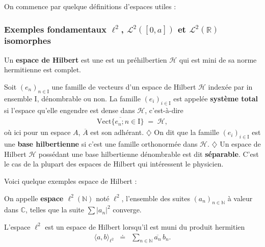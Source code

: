On commence par quelque définitions d'espaces utiles :

\subsubsection{Exemples fondamentaux $\ell^2$, $\mathcal L^2([0,a])$ et $\mathcal L^2(\mathbb R)$ isomorphes}

\begin{Defi} Un {\bf espace de Hilbert} est une est un  préhilbertien ${\mathscr H}$ qui est mini de sa norme hermitienne est complet.\end{Defi}

\begin{Defi}
    Soit $(e_n)_{n \in \mathrm  I}$ une famille de vecteurs d'un espace de Hilbert $\mathscr H$ indexée par in ensemble $\mathrm I$, dénombrable ou non. La famille $(e_i)_{i \in \mathrm  I}$  est appelée {\bf système total}  si l'espace qu'elle engendre est dense dans $\mathscr H$, c'est-à-dire 
    \begin{eqnarray}
        \overline{\mbox{Vect} \{  e_n ; n \in \mathrm I \}}  \; = \; \mathscr H,
    \end{eqnarray}
    où ici pour un espace $A$, $\overline{A}$ est son adhérant.
    \smallskip
    $\diamondsuit$ On dit que la famille $(e_i)_{i \in \mathrm  I}$ est une {\bf base hilbertienne} si c'est une famille orthonormée dans $\mathscr H$. $\diamondsuit$ Un espace de Hilbert $\mathscr H$ possédant une base hilbertienne dénombrable est dit {\bf séparable}. C'est le cas de la plupart des espaces de Hilbert qui intéressent le physicien.

\end{Defi}


\bigskip

Voici quelque exemples espace de Hilbert :
\begin{Defi} 
    On appelle  {\bf espace $\ell^2(\mathbb N)$ } noté $\ell^2$, l'ensemble des suites $(a_n)_{n \in \mathbb N }$ à valeur dans $\mathbb C$, telles que la suite $\sum \vert a_n \vert^2 $ converge.
\end{Defi}

\begin{Theo} 
    L'espace $\ell^2$ est un espace de Hilbert lorsqu'il est muni du produit hermitien 
    \begin{eqnarray}
        \langle a , b \rangle_{\ell^2} & \doteq & \sum_{n \in \mathbb N} \overline{a_n} \,  b_n .
    \end{eqnarray}
\end{Theo}

